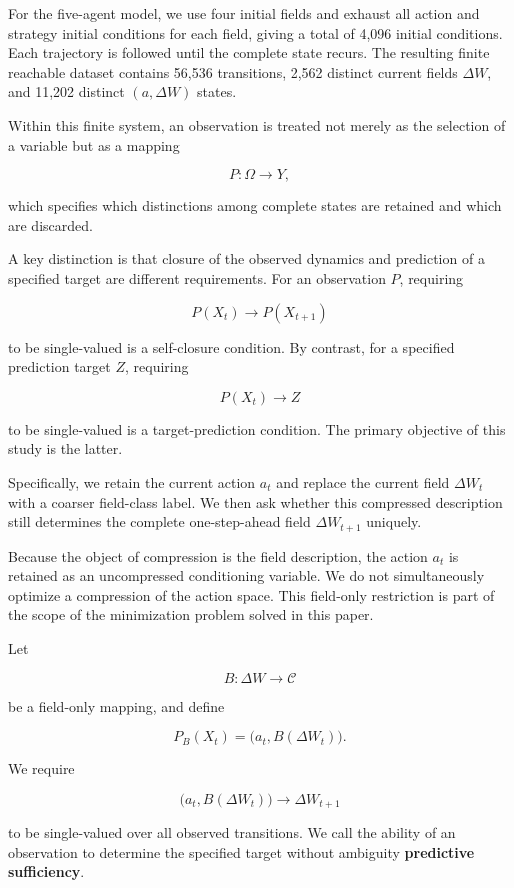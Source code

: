 \documentclass[
  11pt,
]{article}
\begin{document}
For the five-agent model, we use four initial fields and exhaust all
action and strategy initial conditions for each field, giving a total of
4,096 initial conditions. Each trajectory is followed until the complete
state recurs. The resulting finite reachable dataset contains 56,536
transitions, 2,562 distinct current fields \({\Delta W}\), and 11,202
distinct \({(a,\Delta W)}\) states.

Within this finite system, an observation is treated not merely as the
selection of a variable but as a mapping

\[{P:\Omega\longrightarrow Y,}\]

which specifies which distinctions among complete states are retained
and which are discarded.

A key distinction is that closure of the observed dynamics and
prediction of a specified target are different requirements. For an
observation \({P}\), requiring

\[{P(X_t)\longrightarrow P(X_{t+1})}\]

to be single-valued is a self-closure condition. By contrast, for a
specified prediction target \({Z}\), requiring

\[{P(X_t)\longrightarrow Z}\]

to be single-valued is a target-prediction condition. The primary
objective of this study is the latter.

Specifically, we retain the current action \({a_t}\) and replace the
current field \({\Delta W_t}\) with a coarser field-class label. We then
ask whether this compressed description still determines the complete
one-step-ahead field \({\Delta W_{t+1}}\) uniquely.

Because the object of compression is the field description, the action
\({a_t}\) is retained as an uncompressed conditioning variable. We do
not simultaneously optimize a compression of the action space. This
field-only restriction is part of the scope of the minimization problem
solved in this paper.

Let

\[{B:\Delta W\longrightarrow\mathcal C}\]

be a field-only mapping, and define

\[{P_B(X_t)=\bigl(a_t,B(\Delta W_t)\bigr).}\]

We require

\[{\bigl(a_t,B(\Delta W_t)\bigr)\longrightarrow\Delta W_{t+1}}\]

to be single-valued over all observed transitions. We call the ability
of an observation to determine the specified target without ambiguity
\textbf{predictive sufficiency}.
\end{document}
